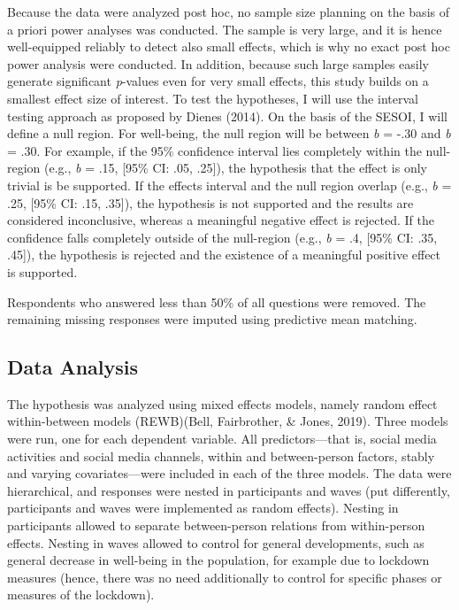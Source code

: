 \documentclass[
  english,
  man,mask,floatsintext]{apa6}
\begin{document}
Because the data were analyzed post hoc, no sample size planning on the basis of a priori power analyses was conducted.
The sample is very large, and it is hence well-equipped reliably to detect also small effects, which is why no exact post hoc power analysis were conducted.
In addition, because such large samples easily generate significant \emph{p}-values even for very small effects, this study builds on a smallest effect size of interest.
To test the hypotheses, I will use the interval testing approach as proposed by Dienes (2014).
On the basis of the SESOI, I will define a null region.
For well-being, the null region will be between \emph{b} = -.30 and \emph{b} = .30.
For example, if the 95\% confidence interval lies completely within the null-region (e.g., \emph{b} = .15, {[}95\% CI: .05, .25{]}), the hypothesis that the effect is only trivial is be supported.
If the effects interval and the null region overlap (e.g., \emph{b} = .25, {[}95\% CI: .15, .35{]}), the hypothesis is not supported and the results are considered inconclusive, whereas a meaningful negative effect is rejected.
If the confidence falls completely outside of the null-region (e.g., \emph{b} = .4, {[}95\% CI: .35, .45{]}), the hypothesis is rejected and the existence of a meaningful positive effect is supported.

Respondents who answered less than 50\% of all questions were removed.
The remaining missing responses were imputed using predictive mean matching.

\hypertarget{data-analysis}{%
\subsection{Data Analysis}\label{data-analysis}}

The hypothesis was analyzed using mixed effects models, namely random effect within-between models (REWB)(Bell, Fairbrother, \& Jones, 2019).
Three models were run, one for each dependent variable.
All predictors---that is, social media activities and social media channels, within and between-person factors, stably and varying covariates---were included in each of the three models.
The data were hierarchical, and responses were nested in participants and waves (put differently, participants and waves were implemented as random effects).
Nesting in participants allowed to separate between-person relations from within-person effects.
Nesting in waves allowed to control for general developments, such as general decrease in well-being in the population, for example due to lockdown measures (hence, there was no need additionally to control for specific phases or measures of the lockdown).
\end{document}
